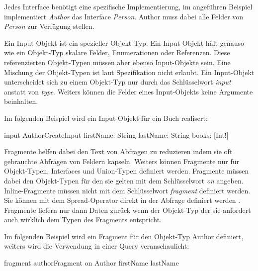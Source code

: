 Jedes Interface benötigt eine spezifische Implementierung, im angeführen Beispiel implementiert \textit{Author} das Interface \textit{Person}.
Author muss dabei alle Felder von \textit{Person} zur Verfügung stellen.

Ein Input-Objekt ist ein spezieller Objekt-Typ. Ein Input-Objekt hält genauso wie ein Objekt-Typ skalare Felder, Enumerationen oder Referenzen.
Diese referenzierten Objekt-Typen müssen aber ebenso Input-Objekte sein.
Eine Mischung der Objekt-Typen ist laut Spezifikation nicht erlaubt.
Ein Input-Objekt unterscheidet sich zu einem Objekt-Typ nur durch das Schlüsselwort \textit{input} anstatt von \textit{type}.
Weiters können die Felder eines Input-Objekts keine Argumente beinhalten.
\newline


Im folgenden Beispiel wird ein Input-Objekt für ein Buch realisert:
\begin{JsCode}
input AuthorCreateInput {
  firstName: String
  lastName: String
  books: [Int!]
}
\end{JsCode}


Fragmente helfen dabei den Text von Abfragen zu reduzieren indem sie oft gebrauchte Abfragen von Feldern kapseln.
Weiters können Fragmente nur für Objekt-Typen, Interfaces und Union-Typen definiert werden.
Fragmente müssen dabei den Objekt-Typen für den sie gelten mit dem Schlüsselwort  \textit{on} angeben.
Inline-Fragmente müssen nicht mit dem Schlüsselwort \textit{fragment} definiert werden.
Sie können mit dem Spread-Operator direkt in der Abfrage definiert werden \cite[Abs. 2.8 -  2.8.1]{graphqlOnline}.
Fragmente liefern nur dann Daten zurück wenn der Objekt-Typ der sie anfordert auch wirklich dem Typen des Fragments entspricht.

Im folgenden Beispiel wird ein Fragment für den Objekt-Typ Author definiert, weiters wird die Verwendung in einer Query veranschaulicht:
\begin{JsCode}
fragment authorFragment on Author {
    firstName
    lastName
}

\end{JsCode}


